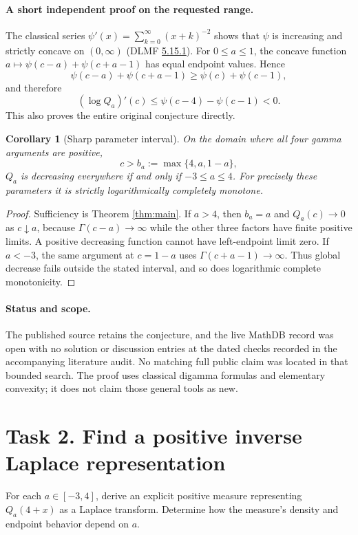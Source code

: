 \documentclass[11pt]{article}
\newtheorem{corollary}[theorem]{Corollary}
\begin{document}
\paragraph{A short independent proof on the requested range.}
The classical series
$\psi'(x)=\sum_{k=0}^\infty(x+k)^{-2}$ shows that $\psi$ is increasing
and strictly concave on $(0,\infty)$
(DLMF \href{https://dlmf.nist.gov/5.15.E1}{5.15.1}).
For $0\le a\le1$, the concave function
$a\mapsto\psi(c-a)+\psi(c+a-1)$ has equal endpoint values.
Hence
\[
 \psi(c-a)+\psi(c+a-1)\ge\psi(c)+\psi(c-1),
\]
and therefore
\[
 (\log Q_a)'(c)
 \le\psi(c-4)-\psi(c-1)<0.
\]
This also proves the entire original conjecture directly.

\begin{corollary}[Sharp parameter interval]
On the domain where all four gamma arguments are positive,
\[
 c>b_a:=\max\{4,a,1-a\},
\]
$Q_a$ is decreasing everywhere if and only if $-3\le a\le4$.
For precisely these parameters it is strictly logarithmically
completely monotone.
\end{corollary}
\begin{proof}
Sufficiency is Theorem \ref{thm:main}. If $a>4$, then $b_a=a$ and
$Q_a(c)\to0$ as $c\downarrow a$, because $\Gamma(c-a)\to\infty$
while the other three factors have finite positive limits.
A positive decreasing function cannot have left-endpoint limit zero.
If $a<-3$, the same argument at $c=1-a$ uses
$\Gamma(c+a-1)\to\infty$. Thus global decrease fails outside the
stated interval, and so does logarithmic complete monotonicity.
\end{proof}

\paragraph{Status and scope.}
The published source retains the conjecture, and the live MathDB
record was open with no solution or discussion entries at the dated
checks recorded in the accompanying literature audit. No matching
full public claim was located in that bounded search.
The proof uses classical digamma formulas and elementary convexity;
it does not claim those general tools as new.

\section*{Task 2. Find a positive inverse Laplace representation}
For each $a\in[-3,4]$, derive an explicit positive measure representing
$Q_a(4+x)$ as a Laplace transform. Determine how the measure's density
and endpoint behavior depend on $a$.
\end{document}
